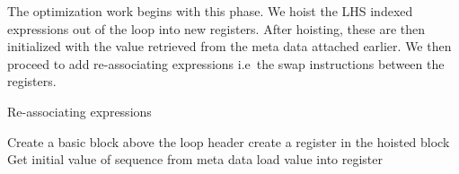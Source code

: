 The optimization work begins with this phase. We hoist the LHS indexed expressions out of the loop into new registers. After hoisting, these are then initialized with the value retrieved from the meta data attached earlier. We then proceed to add re-associating  expressions i.e\ the swap instructions between the registers. 



\begin{algorithm}
	\caption{Re-associating expressions}
	\begin{algorithmic}
		
		\STATE Create a basic block above the loop header
		\STATE create a register in the hoisted block
		\STATE Get initial value of sequence from meta data
		\STATE load value into register
		\ENDFOR
		
	\end{algorithmic}
\end{algorithm}




